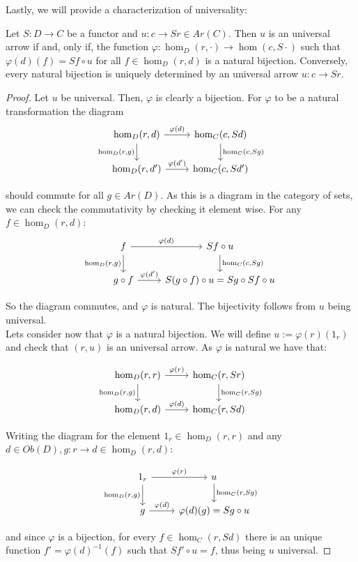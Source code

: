     
  Lastly, we will provide a characterization of universality:
  \begin{proposition}\label{Yoneda-proposition}
      Let $S: D \to C$ be a functor and $u:c\to Sr\in Ar(C)$. Then $u$ is an universal arrow if and, only if, the function $\varphi:\hom_D(r,\cdot)\to \hom(c,S\cdot)$ such that $\varphi(d)(f)= Sf\circ u$ for all $f\in \hom_D(r,d)$ is a natural bijection. Conversely, every natural bijection is uniquely determined by an universal arrow $u:c\to Sr$. 
  \end{proposition}
  \begin{proof}
    Let $u$ be universal. Then, $\varphi$ is clearly a bijection. For $\varphi$ to be a natural transformation the diagram 
    \[
      \begin{tikzcd}
        \hom_D(r,d)\arrow[swap]{d}{\hom_D(r,g)}\arrow{r}{\varphi(d)} & \hom_C(c,Sd)\arrow{d}{\hom_C(c,Sg)}\\
        \hom_D(r,d')\arrow{r}{\varphi(d')} & \hom_C(c,Sd')
      \end{tikzcd}
    \]

    should commute for all $g\in Ar(D)$. As this is a diagram in the category of sets, we can check the commutativity by checking it element wise. For any $f \in\hom_D(r,d)$:
    \[
      \begin{tikzcd}
        f\arrow[swap]{d}{\hom_D(r,g)}\arrow{r}{\varphi(d)} & Sf\circ u \arrow{d}{\hom_C(c,Sg)}\\
        g\circ f \arrow{r}{\varphi(d')} & S(g\circ f) \circ u = Sg\circ Sf \circ u
      \end{tikzcd}
    \]

    So the diagram commutes, and $\varphi$ is natural. The bijectivity follows from $u$ being universal.\\

    Lets consider now that $\varphi$ is a natural bijection. We will define $u := \varphi(r)(1_r)$ and check that $(r,u)$ is an universal arrow. As $\varphi$ is natural we have that:

    \[
      \begin{tikzcd}
        \hom_D(r,r)\arrow[swap]{d}{\hom_D(r,g)}\arrow{r}{\varphi(r)} & \hom_C(r,Sr)\arrow{d}{\hom_C(r,Sg)}\\
        \hom_D(r,d)\arrow{r}{\varphi(d)} & \hom_C(r,Sd)
      \end{tikzcd}
    \]

    Writing the diagram for the element $1_r\in\hom_D(r,r)$ and any $d\in Ob(D), g:r\to d\in \hom_D(r,d)$:

    \[
      \begin{tikzcd}
        1_r \arrow[swap]{d}{\hom_D(r,g)}\arrow{r}{\varphi(r)} & u \arrow{d}{\hom_C(r,Sg)}\\
        g\arrow{r}{\varphi(d)} & \varphi(d)(g)= Sg\circ u
      \end{tikzcd}
    \]

    and since $\varphi$ is a bijection, for every $f\in \hom_C(r,Sd)$ there is an unique function $f' = \varphi(d)^{-1}(f)$ such that $Sf'\circ u = f$, thus being $u$ universal.

  \end{proof}
  
